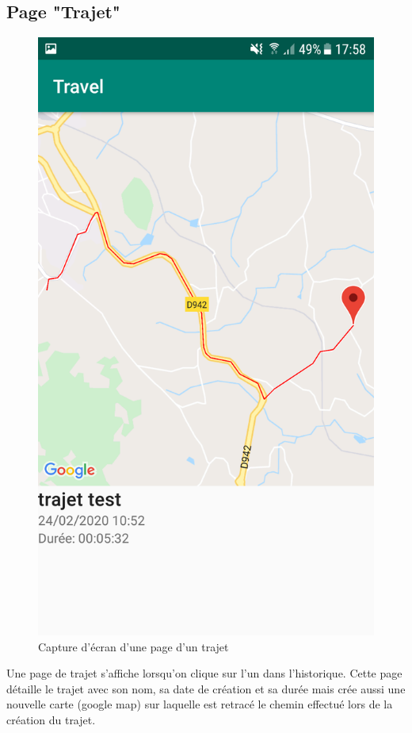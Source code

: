 \subsection{Page "Trajet"}
\begin{figure}
  \vspace{-50pt}
  \label{Trajet}
  \centering
  \includegraphics[scale=0.13]{images/travel.png}
  \caption{Capture d'écran d'une page d'un trajet}
\end{figure}
Une page de trajet s'affiche lorsqu'on clique sur l'un dans l'historique. Cette page détaille le trajet avec son nom, sa date de création et
sa durée mais crée aussi une nouvelle carte (google map) sur laquelle est retracé le chemin effectué lors de la création du trajet.

